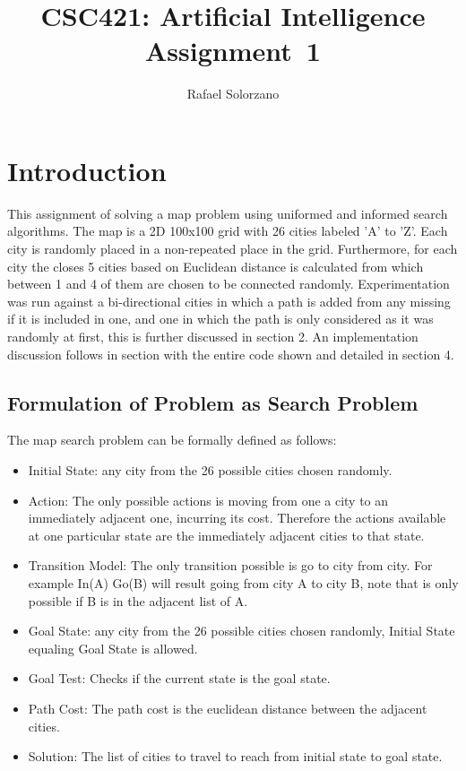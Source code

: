 \documentclass[12pt, letter]{article}
\newcommand{\courseName}{CSC421: Artificial Intelligence}
\newcommand{\assignName}{Assignment~1}
\begin{document}
\pagestyle{titlesec_assignment}

\title{\courseName\\\assignName}
\author{Rafael Solorzano}
\maketitle

\section{Introduction}

This assignment of solving a map problem using uniformed and informed search algorithms. The map is a 2D 100x100 grid with 26 cities labeled 'A' to 'Z'. Each city is randomly placed in a non-repeated place in the grid. Furthermore, for each city the closes 5 cities based on Euclidean distance is calculated from which between 1 and 4 of them are chosen to be connected randomly. Experimentation was run against a bi-directional cities in which a path is added from any missing if it is included in one, and one in which the path is only considered as it was randomly at first, this is further discussed in section 2. An implementation discussion follows in section with the entire code shown and detailed in section 4. 

\subsection{Formulation of Problem as Search Problem}

The map search problem can be formally defined as follows:

\begin{itemize}
	\item Initial State: any city from the 26 possible cities chosen randomly.
	\item Action: The only possible actions is moving from one a city to an immediately adjacent one, incurring its cost. Therefore the actions available at one particular state are the immediately adjacent cities to that state. 
	\item Transition Model: The only transition possible is go to city from city. For example In(A) Go(B) will result going from city A to city B, note that is only possible if B is in the adjacent list of A. 
	\item Goal State: any city from the 26 possible cities chosen randomly, Initial State equaling Goal State is allowed. 
	\item Goal Test: Checks if the current state is the goal state.
	\item Path Cost: The path cost is the euclidean distance between the adjacent cities. 
	\item Solution: The list of cities to travel to reach from initial state to goal state. 
\end{itemize}
\end{document}
